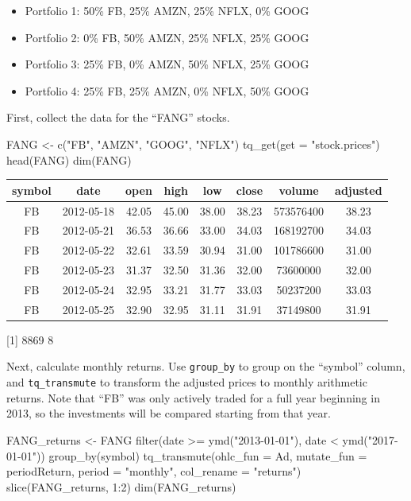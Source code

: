 \begin{itemize}
\tightlist
\item
  Portfolio 1: 50\% FB, 25\% AMZN, 25\% NFLX, 0\% GOOG
\item
  Portfolio 2: 0\% FB, 50\% AMZN, 25\% NFLX, 25\% GOOG
\item
  Portfolio 3: 25\% FB, 0\% AMZN, 50\% NFLX, 25\% GOOG
\item
  Portfolio 4: 25\% FB, 25\% AMZN, 0\% NFLX, 50\% GOOG
\end{itemize}

First, collect the data for the ``FANG'' stocks.

\begin{Schunk}
\begin{Sinput}
FANG <- c("FB", "AMZN", "GOOG", "NFLX") %
    tq_get(get = "stock.prices")
head(FANG)
dim(FANG)
\end{Sinput}
\end{Schunk}

\begin{tabular}{cccccccc}
\toprule
symbol & date & open & high & low & close & volume & adjusted\\
\midrule
FB & 2012-05-18 & 42.05 & 45.00 & 38.00 & 38.23 & 573576400 & 38.23\\
FB & 2012-05-21 & 36.53 & 36.66 & 33.00 & 34.03 & 168192700 & 34.03\\
FB & 2012-05-22 & 32.61 & 33.59 & 30.94 & 31.00 & 101786600 & 31.00\\
FB & 2012-05-23 & 31.37 & 32.50 & 31.36 & 32.00 & 73600000 & 32.00\\
FB & 2012-05-24 & 32.95 & 33.21 & 31.77 & 33.03 & 50237200 & 33.03\\
FB & 2012-05-25 & 32.90 & 32.95 & 31.11 & 31.91 & 37149800 & 31.91\\
\bottomrule
\end{tabular}

{[}1{]} 8869 8

\hspace{20 mm}

Next, calculate monthly returns. Use \texttt{group\_by} to group on the
``symbol'' column, and \texttt{tq\_transmute} to transform the adjusted
prices to monthly arithmetic returns. Note that ``FB'' was only actively
traded for a full year beginning in 2013, so the investments will be
compared starting from that year.

\begin{Schunk}
\begin{Sinput}
FANG_returns <- FANG %
    filter(date >= ymd("2013-01-01"),
           date <  ymd("2017-01-01")) %
    group_by(symbol) %
    tq_transmute(ohlc_fun = Ad,
                 mutate_fun = periodReturn,
                 period = "monthly",
                 col_rename = "returns")
slice(FANG_returns, 1:2)
dim(FANG_returns)
\end{Sinput}
\end{Schunk}

